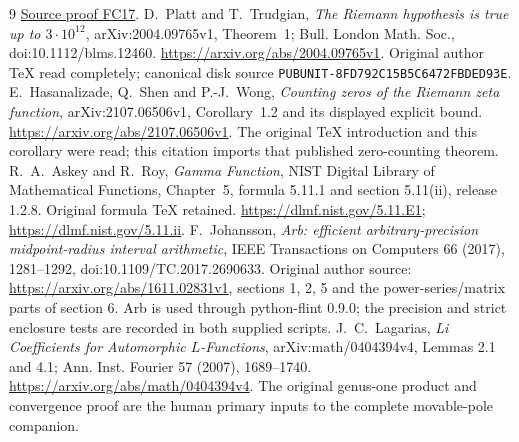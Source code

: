 \documentclass[11pt]{article}
\begin{document}
\begin{thebibliography}{9}
\href{https://github.com/KokunoYumeto/zeta-function-research-reader/blob/5992ad50c0f2a06921f1fcaded7b4e38097c0739/workbenches/splitzero-tandem/continuations/20260920-original-kernel-mixed-determinants/providers/FABLE_TO_ORIGINAL_CONDUCTOR.tex\#L300}{Source proof FC17}.
 D.~Platt and T.~Trudgian,
\emph{The Riemann hypothesis is true up to $3\cdot10^{12}$},
arXiv:2004.09765v1, Theorem~1; Bull. London Math. Soc.,
doi:10.1112/blms.12460.
\url{https://arxiv.org/abs/2004.09765v1}.
Original author TeX read completely; canonical disk source
\texttt{PUBUNIT-8FD792C15B5C6472FBDED93E}.
 E.~Hasanalizade, Q.~Shen and P.-J.~Wong,
\emph{Counting zeros of the Riemann zeta function},
arXiv:2107.06506v1, Corollary~1.2 and its displayed explicit
bound. \url{https://arxiv.org/abs/2107.06506v1}.
The original TeX introduction and this corollary were read;
this citation imports that published zero-counting theorem.
 R.~A.~Askey and R.~Roy,
\emph{Gamma Function}, NIST Digital Library of Mathematical
Functions, Chapter~5, formula 5.11.1 and section 5.11(ii),
release 1.2.8. Original formula TeX retained.
\url{https://dlmf.nist.gov/5.11.E1};
\url{https://dlmf.nist.gov/5.11.ii}.
 F.~Johansson,
\emph{Arb: efficient arbitrary-precision midpoint-radius
interval arithmetic}, IEEE Transactions on Computers 66
(2017), 1281--1292, doi:10.1109/TC.2017.2690633.
Original author source: \url{https://arxiv.org/abs/1611.02831v1},
sections 1, 2, 5 and the power-series/matrix parts of section 6.
Arb is used through python-flint 0.9.0; the precision and
strict enclosure tests are recorded in both supplied scripts.
 J.~C.~Lagarias,
\emph{Li Coefficients for Automorphic $L$-Functions},
arXiv:math/0404394v4, Lemmas 2.1 and 4.1; Ann. Inst. Fourier
57 (2007), 1689--1740.
\url{https://arxiv.org/abs/math/0404394v4}.
The original genus-one product and convergence proof are the
human primary inputs to the complete movable-pole companion.
\end{thebibliography}
\end{document}
